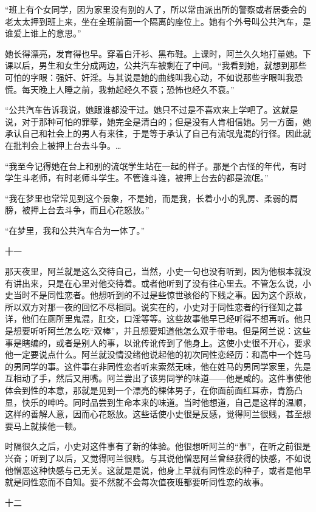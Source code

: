 “班上有个女同学，因为家里没有别的人了，所以常由派出所的警察或者居委会的老太太押到班上来，坐在全班前面一个隔离的座位上。她有个外号叫公共汽车，是谁爱上谁上的意思。” 

她长得漂亮，发育得也早。穿着白汗衫、黑布鞋。上课时，阿兰久久地打量她。下课以后，男生和女生分成两边，公共汽车被剩在了中间。“我看到她，就想到那些可怕的字眼：强奸、奸淫。与其说是她的曲线叫我心动，不如说那些字眼叫我恐慌。每天晚上人睡之前，我勃起经久不衰；恐怖也经久不衰。” 

“公共汽车告诉我说，她跟谁都没干过。她只不过是不喜欢来上学吧了。这就是说，对于那种可怕的罪孽，她完全是清白的；但是没有人肯相信她。另一方面，她承认自己和社会上的男人有来往，于是等于承认了自己有流氓鬼混的行径。因此就在批判会上被押上台去斗争。… 

“我至今记得她在台上和别的流氓学生站在一起的样子。那是个古怪的年代，有时学生斗老师，有时老师斗学生。不管谁斗谁，被押上台去的都是流氓。” 

“我在梦里也常常见到这个景象，不是她，而是我，长着小小的乳房、柔弱的肩膀，被押上台去斗争，而且心花怒放。” 

“在梦里，我和公共汽车合为一体了。” 

十一 

那天夜里，阿兰就是这么交待自己，当然，小史一句也没有听到，因为他根本就没有讲出来，只是在心里对他交待着。或者他听到了没有往心里去。不管怎么说，小史当时不是同性恋者。他想听到的不过是些惊世骇俗的下贱之事。因为这个原故，所以双方对那一夜的回忆不尽相同。说实在的，小史对于同性恋者的行径知之甚详，他们在厕所里鬼混，肛交，口淫等等。这些故事他早已经听得不想再听。他只是想要听听阿兰怎么吃“双棒”，并且想要知道他怎么双手带电。但是阿兰说：这些事是瞎编的，或者是别人的事，以讹传讹传到了他身上。这使小史很不开心，要求他一定要说点什么。阿兰就没情没绪他说起他的初次同性恋经历：和高中一个姓马的男同学的事。这件事在非同性恋者听来索然无味，他在姓马的男同学家里，先是互相动了手，然后又用嘴。阿兰尝出了该男同学的味道——他是咸的。这件事使他体会到性的本意，那就是见到一个漂亮的棵体男子，在你面前面红耳赤，青筋凸显，快乐的呻吟。同时品尝到生命本来的味道。当时他想道，自己是这样的温顺，这样的善解人意，因而心花怒放。这些话使小史很是反感，觉得阿兰很贱，甚至想要马上就揍他一顿。 

时隔很久之后，小史对这件事有了新的体验。他很想听阿兰的“事”，在听之前很是兴奋；听到了以后，又觉得阿兰很贱。与其说他憎恶阿兰曾经获得的快感，不如说他憎恶这种快感与己无关。这就是是说，他身上早就有同性恋的种子，或者是他早就是同性恋而不自知。要不然就不会每次值夜班都要听同性恋的故事。 

十二 

